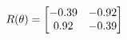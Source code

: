 \documentclass[preview]{standalone}
\begin{document}
\begin{align*}
\special{dvisvgm:raw <g id='unique000'>}R(\theta) = \begin{bmatrix}-0.39 & -0.92\\0.92 & -0.39\end{bmatrix}\special{dvisvgm:raw </g>}
\end{align*}
\end{document}
